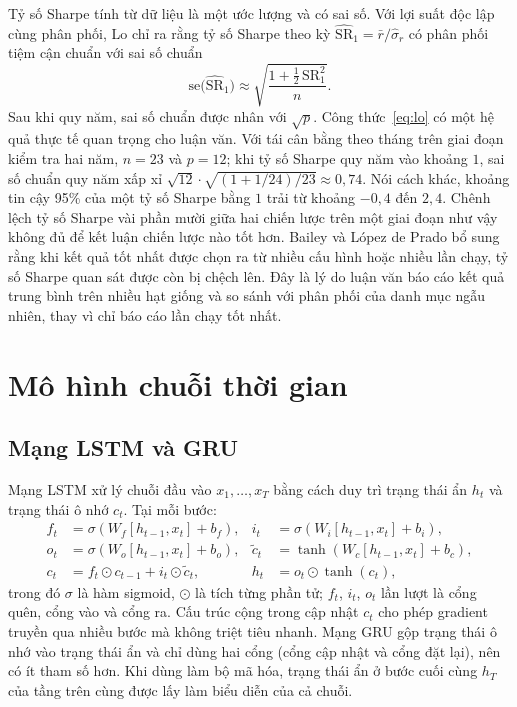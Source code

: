 Tỷ số Sharpe tính từ dữ liệu là một ước lượng và có sai số. Với lợi suất độc lập cùng phân phối, Lo \cite{lo2002} chỉ ra rằng tỷ số Sharpe theo kỳ $\widehat{\mathrm{SR}}_{1}=\bar r/\hat\sigma_r$ có phân phối tiệm cận chuẩn với sai số chuẩn
\begin{equation}
\mathrm{se}\big(\widehat{\mathrm{SR}}_{1}\big)\approx\sqrt{\frac{1+\tfrac12\,\mathrm{SR}_{1}^{2}}{n}} .
\label{eq:lo}
\end{equation}
Sau khi quy năm, sai số chuẩn được nhân với $\sqrt{p}$. Công thức~\eqref{eq:lo} có một hệ quả thực tế quan trọng cho luận văn. Với tái cân bằng theo tháng trên giai đoạn kiểm tra hai năm, $n=23$ và $p=12$; khi tỷ số Sharpe quy năm vào khoảng $1$, sai số chuẩn quy năm xấp xỉ $\sqrt{12}\cdot\sqrt{(1+1/24)/23}\approx 0{,}74$. Nói cách khác, khoảng tin cậy 95\% của một tỷ số Sharpe bằng $1$ trải từ khoảng $-0{,}4$ đến $2{,}4$. Chênh lệch tỷ số Sharpe vài phần mười giữa hai chiến lược trên một giai đoạn như vậy không đủ để kết luận chiến lược nào tốt hơn. Bailey và López de Prado \cite{bailey2014} bổ sung rằng khi kết quả tốt nhất được chọn ra từ nhiều cấu hình hoặc nhiều lần chạy, tỷ số Sharpe quan sát được còn bị chệch lên. Đây là lý do luận văn báo cáo kết quả trung bình trên nhiều hạt giống và so sánh với phân phối của danh mục ngẫu nhiên, thay vì chỉ báo cáo lần chạy tốt nhất.

\section{Mô hình chuỗi thời gian}
\label{sec:lt-chuoi}

\subsection{Mạng LSTM và GRU}

Mạng LSTM \cite{hochreiter1997} xử lý chuỗi đầu vào $x_1,\dots,x_T$ bằng cách duy trì trạng thái ẩn $h_t$ và trạng thái ô nhớ $c_t$. Tại mỗi bước:
\begin{equation}
\begin{aligned}
f_t&=\sigma(W_f[h_{t-1},x_t]+b_f), & i_t&=\sigma(W_i[h_{t-1},x_t]+b_i),\\
o_t&=\sigma(W_o[h_{t-1},x_t]+b_o), & \tilde c_t&=\tanh(W_c[h_{t-1},x_t]+b_c),\\
c_t&=f_t\odot c_{t-1}+i_t\odot\tilde c_t, & h_t&=o_t\odot\tanh(c_t),
\end{aligned}
\label{eq:lstm}
\end{equation}
trong đó $\sigma$ là hàm sigmoid, $\odot$ là tích từng phần tử; $f_t$, $i_t$, $o_t$ lần lượt là cổng quên, cổng vào và cổng ra. Cấu trúc cộng trong cập nhật $c_t$ cho phép gradient truyền qua nhiều bước mà không triệt tiêu nhanh. Mạng GRU \cite{cho2014} gộp trạng thái ô nhớ vào trạng thái ẩn và chỉ dùng hai cổng (cổng cập nhật và cổng đặt lại), nên có ít tham số hơn. Khi dùng làm bộ mã hóa, trạng thái ẩn ở bước cuối cùng $h_T$ của tầng trên cùng được lấy làm biểu diễn của cả chuỗi.

